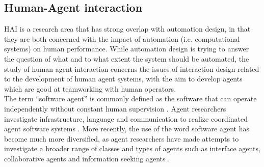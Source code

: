 
\subsection{Human-Agent interaction}\label{sec:LRHAI}
\acf{HAI} is a research area that has strong overlap with automation design, in that they are both concerned with the impact of automation (i.e. computational systems) on human performance. While automation design is trying to answer the question of what and to what extent the system should be automated, the study of human agent interaction concerns the issues of interaction design related to the development of human agent systems, with the aim to develop agents which are good at teamworking with human operators\citep{Bradshaw2011,Sukthankara}. \\

The term ``software agent'' is commonly defined as the software that can operate independently without constant human supervision \citep{Vlassis2007}. Agent researchers investigate infrastructure, language and communication to realize coordinated agent software systems \citep{Nwana1996}. More recently, the use of the word software agent has become much more diversified, as agent researchers have made attempts to investigate a broader range of classes and types of agents such as interface agents, collaborative agents and information seeking agents \citep{Nwana1996}.  \\

